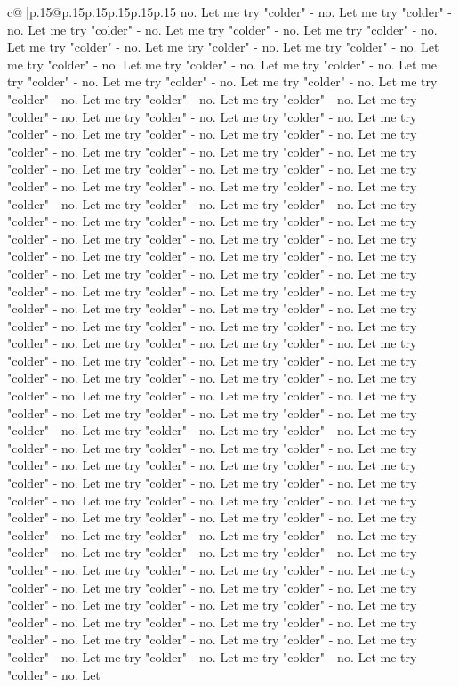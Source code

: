 \documentclass{article}
\begin{document}
{\begin{supertabular}{c@{$\;$}|p{.15\linewidth}@{}p{.15\linewidth}p{.15\linewidth}p{.15\linewidth}p{.15\linewidth}p{.15\linewidth}}
{{{no. Let me try "colder" {-} no. Let me try "colder" {-} no. Let me try "colder" {-} no. Let me try "colder" {-} no. Let me try "colder" {-} no. Let me try "colder" {-} no. Let me try "colder" {-} no. Let me try "colder" {-} no. Let me try "colder" {-} no. Let me try "colder" {-} no. Let me try "colder" {-} no. Let me try "colder" {-} no. Let me try "colder" {-} no. Let me try "colder" {-} no. Let me try "colder" {-} no. Let me try "colder" {-} no. Let me try "colder" {-} no. Let me try "colder" {-} no. Let me try "colder" {-} no. Let me try "colder" {-} no. Let me try "colder" {-} no. Let me try "colder" {-} no. Let me try "colder" {-} no. Let me try "colder" {-} no. Let me try "colder" {-} no. Let me try "colder" {-} no. Let me try "colder" {-} no. Let me try "colder" {-} no. Let me try "colder" {-} no. Let me try "colder" {-} no. Let me try "colder" {-} no. Let me try "colder" {-} no. Let me try "colder" {-} no. Let me try "colder" {-} no. Let me try "colder" {-} no. Let me try "colder" {-} no. Let me try "colder" {-} no. Let me try "colder" {-} no. Let me try "colder" {-} no. Let me try "colder" {-} no. Let me try "colder" {-} no. Let me try "colder" {-} no. Let me try "colder" {-} no. Let me try "colder" {-} no. Let me try "colder" {-} no. Let me try "colder" {-} no. Let me try "colder" {-} no. Let me try "colder" {-} no. Let me try "colder" {-} no. Let me try "colder" {-} no. Let me try "colder" {-} no. Let me try "colder" {-} no. Let me try "colder" {-} no. Let me try "colder" {-} no. Let me try "colder" {-} no. Let me try "colder" {-} no. Let me try "colder" {-} no. Let me try "colder" {-} no. Let me try "colder" {-} no. Let me try "colder" {-} no. Let me try "colder" {-} no. Let me try "colder" {-} no. Let me try "colder" {-} no. Let me try "colder" {-} no. Let me try "colder" {-} no. Let me try "colder" {-} no. Let me try "colder" {-} no. Let me try "colder" {-} no. Let me try "colder" {-} no. Let me try "colder" {-} no. Let me try "colder" {-} no. Let me try "colder" {-} no. Let me try "colder" {-} no. Let me try "colder" {-} no. Let me try "colder" {-} no. Let me try "colder" {-} no. Let me try "colder" {-} no. Let me try "colder" {-} no. Let me try "colder" {-} no. Let me try "colder" {-} no. Let me try "colder" {-} no. Let me try "colder" {-} no. Let me try "colder" {-} no. Let me try "colder" {-} no. Let me try "colder" {-} no. Let me try "colder" {-} no. Let me try "colder" {-} no. Let me try "colder" {-} no. Let me try "colder" {-} no. Let me try "colder" {-} no. Let me try "colder" {-} no. Let me try "colder" {-} no. Let me try "colder" {-} no. Let me try "colder" {-} no. Let me try "colder" {-} no. Let me try "colder" {-} no. Let me try "colder" {-} no. Let me try "colder" {-} no. Let me try "colder" {-} no. Let me try "colder" {-} no. Let me try "colder" {-} no. Let me try "colder" {-} no. Let me try "colder" {-} no. Let me try "colder" {-} no. Let me try "colder" {-} no. Let me try "colder" {-} no. Let me try "colder" {-} no. Let me try "colder" {-} no. Let me try "colder" {-} no. Let me try "colder" {-} no. Let me try "colder" {-} no. Let me try "colder" {-} no. Let me try "colder" {-} no. Let me try "colder" {-} no. Let }}}
\end{supertabular}}
\end{document}
